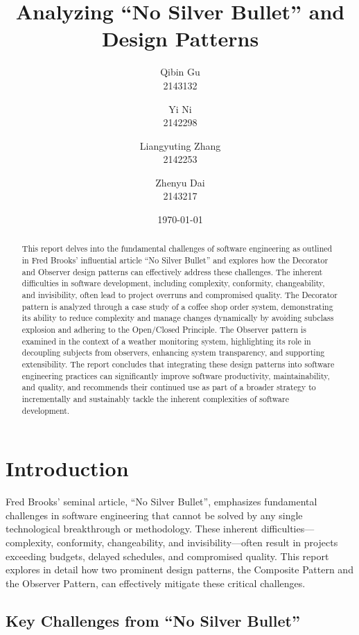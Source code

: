 \documentclass[11pt]{article}
\title{Analyzing ``No Silver Bullet'' and Design Patterns}
\author{Qibin Gu\\2143132 \and Yi Ni\\2142298 \and Liangyuting Zhang\\2142253 \and Zhenyu Dai\\2143217}
\date{\today}
\begin{document}
%
\maketitle
\begin{abstract}
This report delves into the fundamental challenges of software engineering as outlined in Fred Brooks' influential article ``No Silver Bullet'' and explores how the Decorator and Observer design patterns can effectively address these challenges. The inherent difficulties in software development, including complexity, conformity, changeability, and invisibility, often lead to project overruns and compromised quality. The Decorator pattern is analyzed through a case study of a coffee shop order system, demonstrating its ability to reduce complexity and manage changes dynamically by avoiding subclass explosion and adhering to the Open/Closed Principle. The Observer pattern is examined in the context of a weather monitoring system, highlighting its role in decoupling subjects from observers, enhancing system transparency, and supporting extensibility. The report concludes that integrating these design patterns into software engineering practices can significantly improve software productivity, maintainability, and quality, and recommends their continued use as part of a broader strategy to incrementally and sustainably tackle the inherent complexities of software development.
\end{abstract}

\newpage

\section{Introduction}
Fred Brooks' seminal article, ``No Silver Bullet'', emphasizes fundamental challenges in software engineering that cannot be solved by any single technological breakthrough or methodology. These inherent difficulties—complexity, conformity, changeability, and invisibility—often result in projects exceeding budgets, delayed schedules, and compromised quality. This report explores in detail how two prominent design patterns, the Composite Pattern and the Observer Pattern, can effectively mitigate these critical challenges.

\subsection{Key Challenges from ``No Silver Bullet''}
\end{document}
